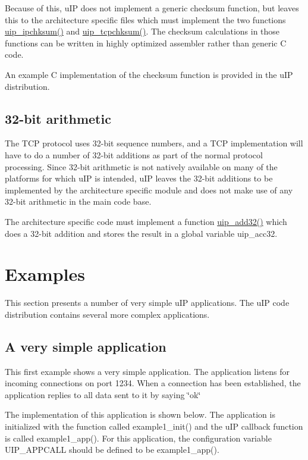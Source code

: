 Because of this, u\-IP does not implement a generic checksum function, but leaves this to the architecture specific files which must implement the two functions \hyperlink{a00066_g2addf34c7d457c1a7899a7e2171ef1e9}{uip\_\-ipchksum()} and \hyperlink{a00066_g85b65e38aa74eba18979156f97a94a87}{uip\_\-tcpchksum()}. The checksum calculations in those functions can be written in highly optimized assembler rather than generic C code.

An example C implementation of the checksum function is provided in the u\-IP distribution.\hypertarget{main_longarith}{}\subsection{32-bit arithmetic}\label{main_longarith}
The TCP protocol uses 32-bit sequence numbers, and a TCP implementation will have to do a number of 32-bit additions as part of the normal protocol processing. Since 32-bit arithmetic is not natively available on many of the platforms for which u\-IP is intended, u\-IP leaves the 32-bit additions to be implemented by the architecture specific module and does not make use of any 32-bit arithmetic in the main code base.

The architecture specific code must implement a function \hyperlink{a00066_g6832e4d2d046536b6472f7ac92340f68}{uip\_\-add32()} which does a 32-bit addition and stores the result in a global variable uip\_\-acc32.\hypertarget{main_examples}{}\section{Examples}\label{main_examples}
This section presents a number of very simple u\-IP applications. The u\-IP code distribution contains several more complex applications.\hypertarget{main_example1}{}\subsection{A very simple application}\label{main_example1}
This first example shows a very simple application. The application listens for incoming connections on port 1234. When a connection has been established, the application replies to all data sent to it by saying \char`\"{}ok\char`\"{}

The implementation of this application is shown below. The application is initialized with the function called example1\_\-init() and the u\-IP callback function is called example1\_\-app(). For this application, the configuration variable UIP\_\-APPCALL should be defined to be example1\_\-app().



